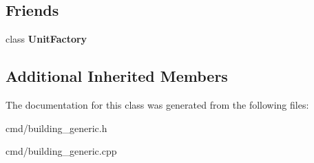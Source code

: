 \subsection*{Friends}
\begin{DoxyCompactItemize}
\item 
class {\bfseries Unit\+Factory}\hypertarget{classBuilding_a187c66d2d867f6265d3b0c99ffc34838}{}\label{classBuilding_a187c66d2d867f6265d3b0c99ffc34838}

\end{DoxyCompactItemize}
\subsection*{Additional Inherited Members}


The documentation for this class was generated from the following files\+:\begin{DoxyCompactItemize}
\item 
cmd/building\+\_\+generic.\+h\item 
cmd/building\+\_\+generic.\+cpp\end{DoxyCompactItemize}

